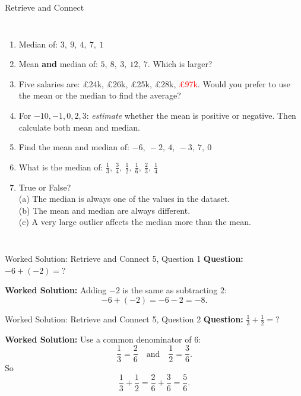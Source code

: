 \documentclass{beamer}
\newcommand{\ashow}[1]{\uncover<2->{\textcolor{red}{\small #1}}}
\newcommand{\ashowq}[1]{\alt<2->{\textcolor{red}{\small #1}}{?}}
\begin{document}
\begin{frame}{Retrieve and Connect}
\begin{columns}[T]
\footnotesize
\vspace{0.3em}
\begin{enumerate}\itemsep1pt
  \vspace{-1em}
  \item Median of: $3,\ 9,\ 4,\ 7,\ 1$ \ashow{4}
  \item Mean \textbf{and} median of: $5,\ 8,\ 3,\ 12,\ 7$. Which is larger? \ashow{equal (both $7$)}
  \item Five salaries are: £24k, £26k, £25k, £28k, \textcolor{red}{£97k}. Would you prefer to use the mean or the median to find the average? \ashow{the median}
  \item For $-10,-1,0,2,3$: \textit{estimate} whether the mean is positive or negative. Then calculate both mean and median. \ashow{negative: mean $-1.2$; median $0$}
  \item Find the mean and median of: $-6,\ -2,\ 4,\ -3,\ 7,\ 0$ \ashow{mean $0$; median $-1$}
  \item What is the median of: $\frac{1}{3},\ \frac{3}{4},\ \frac{1}{2},\ \frac{1}{6},\ \frac{2}{3},\ \frac{1}{4}$ \ashow{$\frac{5}{12}$}
  \item True or False?\\
    (a) The median is always one of the values in the dataset. \ashow{False}\\
    (b) The mean and median are always different. \ashow{False}\\
    (c) A very large outlier affects the median more than the mean. \ashow{False}

\end{enumerate}

\end{columns}
\end{frame}

\begin{frame}{Worked Solution: Retrieve and Connect 5, Question 1}
\hypertarget{work-st5}{}
\textbf{Question:} \(-6 + (-2) = ?\)

\textbf{Worked Solution:}
Adding \(-2\) is the same as subtracting \(2\):
\[
-6 + (-2) = -6 - 2 = -8.
\]
\end{frame}

\begin{frame}{Worked Solution: Retrieve and Connect 5, Question 2}
\textbf{Question:} \(\frac{1}{3} + \frac{1}{2} = ?\)

\textbf{Worked Solution:}
Use a common denominator of \(6\):
\[
\frac{1}{3} = \frac{2}{6}
\quad\text{and}\quad
\frac{1}{2} = \frac{3}{6}.
\]
So
\[
\frac{1}{3} + \frac{1}{2}
= \frac{2}{6} + \frac{3}{6}
= \frac{5}{6}.
\]
\end{frame}
\end{document}
